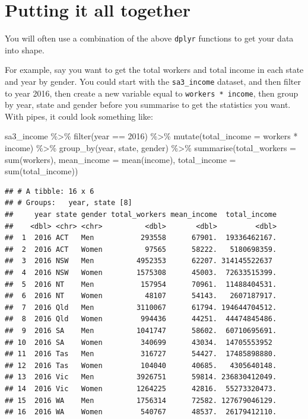 \documentclass[
]{book}
\newenvironment{Shaded}{\begin{snugshade}}{\end{snugshade}}
\newcommand{\AttributeTok}[1]{\textcolor[rgb]{0.77,0.63,0.00}{#1}}
\newcommand{\DecValTok}[1]{\textcolor[rgb]{0.00,0.00,0.81}{#1}}
\newcommand{\FunctionTok}[1]{\textcolor[rgb]{0.00,0.00,0.00}{#1}}
\newcommand{\NormalTok}[1]{#1}
\newcommand{\SpecialCharTok}[1]{\textcolor[rgb]{0.00,0.00,0.00}{#1}}
\begin{document}
\hypertarget{putting-it-all-together}{%
\section{Putting it all together}\label{putting-it-all-together}}

You will often use a combination of the above \texttt{dplyr} functions to get your data into shape.

For example, say you want to get the total workers and total income in each state and year by gender. You could start with the \texttt{sa3\_income} dataset, and then filter to year 2016, then create a new variable equal to \texttt{workers\ *\ income}, then group by year, state and gender before you summarise to get the statistics you want. With pipes, it could look something like:

\begin{Shaded}
\begin{Highlighting}[]
\NormalTok{sa3\_income }\SpecialCharTok{\%\textgreater{}\%} 
  \FunctionTok{filter}\NormalTok{(year }\SpecialCharTok{==} \DecValTok{2016}\NormalTok{) }\SpecialCharTok{\%\textgreater{}\%} 
  \FunctionTok{mutate}\NormalTok{(}\AttributeTok{total\_income =}\NormalTok{ workers }\SpecialCharTok{*}\NormalTok{ income) }\SpecialCharTok{\%\textgreater{}\%} 
  \FunctionTok{group\_by}\NormalTok{(year, state, gender) }\SpecialCharTok{\%\textgreater{}\%} 
  \FunctionTok{summarise}\NormalTok{(}\AttributeTok{total\_workers =} \FunctionTok{sum}\NormalTok{(workers),}
            \AttributeTok{mean\_income =} \FunctionTok{mean}\NormalTok{(income),}
            \AttributeTok{total\_income =} \FunctionTok{sum}\NormalTok{(total\_income))}
\end{Highlighting}
\end{Shaded}

\begin{verbatim}
## # A tibble: 16 x 6
## # Groups:   year, state [8]
##     year state gender total_workers mean_income  total_income
##    <dbl> <chr> <chr>          <dbl>       <dbl>         <dbl>
##  1  2016 ACT   Men           293558      67901.  19336462167.
##  2  2016 ACT   Women          97565      58222.   5180698359.
##  3  2016 NSW   Men          4952353      62207. 314145522637 
##  4  2016 NSW   Women        1575308      45003.  72633515399.
##  5  2016 NT    Men           157954      70961.  11488404531.
##  6  2016 NT    Women          48107      54143.   2607187917.
##  7  2016 Qld   Men          3110067      61794. 194644704512.
##  8  2016 Qld   Women         994436      44251.  44474845486.
##  9  2016 SA    Men          1041747      58602.  60710695691.
## 10  2016 SA    Women         340699      43034.  14705553952 
## 11  2016 Tas   Men           316727      54427.  17485898880.
## 12  2016 Tas   Women         104040      40685.   4305640148.
## 13  2016 Vic   Men          3926751      59814. 236830412049.
## 14  2016 Vic   Women        1264225      42816.  55273320473.
## 15  2016 WA    Men          1756314      72582. 127679046129.
## 16  2016 WA    Women         540767      48537.  26179412110.
\end{verbatim}
\end{document}
